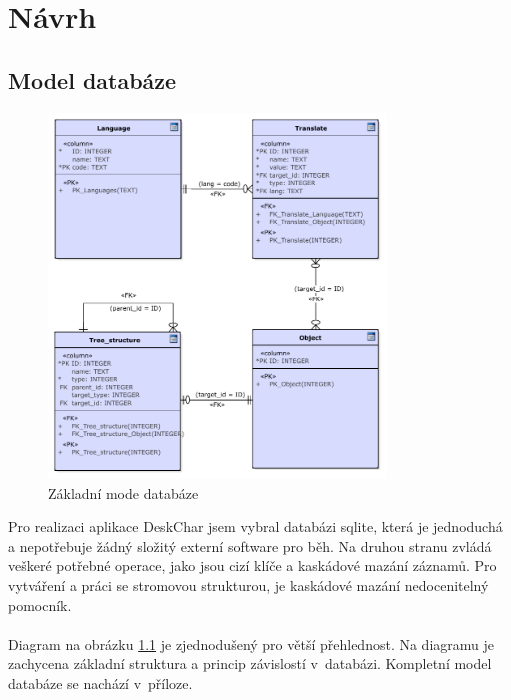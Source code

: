 \documentclass[thesis=B,czech]{resources/FITthesis}[2012/06/26]
\begin{document}
\chapter{Návrh}
	\section{Model databáze}
	\begin{figure}\centering
	\includegraphics[width=0.8\textwidth]{images/basic_database}
	\caption[Základní model databáze]{Základní mode databáze}\label{fig:db_basic}
	\end{figure}
	Pro realizaci aplikace DeskChar jsem vybral databázi sqlite, která je jednoduchá a nepotřebuje žádný složitý externí software pro běh. Na druhou stranu zvládá veškeré potřebné operace, jako jsou cizí klíče a kaskádové mazání záznamů. Pro vytváření a práci se stromovou strukturou, je kaskádové mazání nedocenitelný pomocník. \\
\\
Diagram na obrázku \ref{fig:db_basic} je zjednodušený pro větší přehlednost. Na diagramu je zachycena základní struktura a princip závislostí v~databázi. Kompletní model databáze se nachází v~příloze.\\
\\
\end{document}
